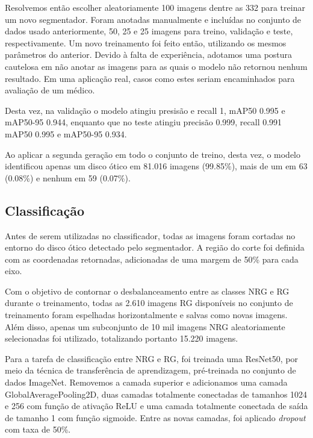 \documentclass[12pt]{article}
\begin{document}
Resolvemos então escolher aleatoriamente 100 imagens dentre as 332 para treinar um novo segmentador. Foram anotadas manualmente e incluídas no conjunto de dados usado anteriormente, 50, 25 e 25 imagens para treino, validação e teste, respectivamente. Um novo treinamento foi feito então, utilizando os mesmos parâmetros do anterior. Devido à falta de experiência, adotamos uma postura cautelosa em não anotar as imagens para as quais o modelo não retornou nenhum resultado. Em uma aplicação real, casos como estes seriam encaminhados para avaliação de um médico.

Desta vez, na validação o modelo atingiu presisão e recall 1, mAP50 0.995 e mAP50-95 0.944, enquanto que no teste atingiu precisão 0.999, recall 0.991 mAP50 0.995 e mAP50-95 0.934.

Ao aplicar a segunda geração em todo o conjunto de treino, desta vez, o modelo identificou apenas um disco ótico em 81.016 imagens (99.85\%), mais de um em 63 (0.08\%) e nenhum em 59 (0.07\%).


\subsection{Classificação}
\label{sec:classification}

Antes de serem utilizadas no classificador, todas as imagens foram cortadas no entorno do disco ótico detectado pelo segmentador. A região do corte foi definida com as coordenadas retornadas, adicionadas de uma margem de 50\% para cada eixo.

Com o objetivo de contornar o desbalanceamento entre as classes NRG e RG durante o treinamento, todas as 2.610 imagens RG disponíveis no conjunto de treinamento foram espelhadas horizontalmente e salvas como novas imagens. Além disso, apenas um subconjunto de 10 mil imagens NRG aleatoriamente selecionadas foi utilizado, totalizando portanto 15.220 imagens.


Para a tarefa de classificação entre NRG e RG, foi treinada uma ResNet50, por meio da técnica de transferência de aprendizagem, pré-treinada no conjunto de dados ImageNet. Removemos a camada superior e adicionamos uma camada GlobalAveragePooling2D, duas camadas totalmente conectadas de tamanhos 1024 e 256 com função de ativação ReLU e uma camada totalmente conectada de saída de tamanho 1 com função sigmoide. Entre as novas camadas, foi aplicado \emph{dropout} com taxa de 50\%.
\end{document}
